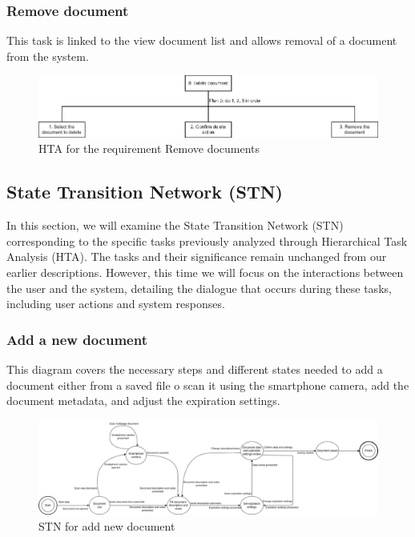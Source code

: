 \subsubsection{Remove document}
This task is linked to the view document list and allows removal of a document from the system.
\begin{figure}[H]
	\centering
	\includegraphics[width=\textwidth]{../Draw.io diagrams/delete_document.drawio.png}  %
	\caption{HTA for the requirement Remove documents}
\end{figure}
\subsection{State Transition Network (STN)}
In this section, we will examine the State Transition Network (STN) corresponding to the specific tasks previously analyzed through Hierarchical Task Analysis (HTA). The tasks and their significance remain unchanged from our earlier descriptions. However, this time we will focus on the interactions between the user and the system, detailing the dialogue that occurs during these tasks, including user actions and system responses.
\subsubsection{Add a new document}
This diagram covers the necessary steps and different states needed to add a document either from a saved file o scan it using the smartphone camera, add the document metadata, and adjust the expiration settings.
\begin{figure}[H]
	\centering
	\includegraphics[width=\textwidth]{../Draw.io diagrams/documnet_add_STN.drawio.png}  %
	\caption{STN for add new document}
\end{figure}
